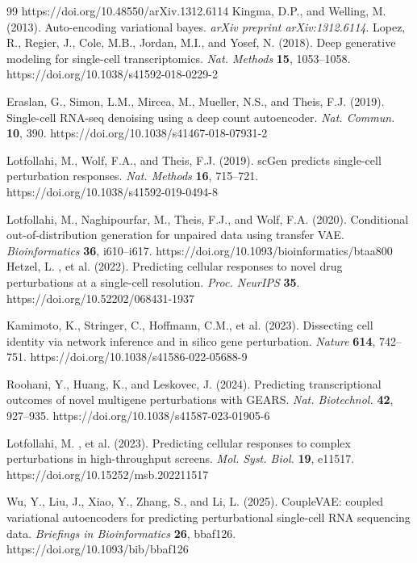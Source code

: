 \documentclass[11pt,a4paper]{article}
\begin{document}
\begin{thebibliography}{99}
 https://doi.org/10.48550/arXiv.1312.6114 Kingma, D.P., and Welling, M. (2013). Auto-encoding variational bayes. \textit{arXiv preprint arXiv:1312.6114}.
 Lopez, R., Regier, J., Cole, M.B., Jordan, M.I., and Yosef, N. (2018). Deep generative modeling for single-cell transcriptomics. \textit{Nat. Methods} \textbf{15}, 1053--1058. https://doi.org/10.1038/s41592-018-0229-2

 Eraslan, G., Simon, L.M., Mircea, M., Mueller, N.S., and Theis, F.J. (2019). Single-cell RNA-seq denoising using a deep count autoencoder. \textit{Nat. Commun.} \textbf{10}, 390. https://doi.org/10.1038/s41467-018-07931-2

 Lotfollahi, M., Wolf, F.A., and Theis, F.J. (2019). scGen predicts single-cell perturbation responses. \textit{Nat. Methods} \textbf{16}, 715--721. https://doi.org/10.1038/s41592-019-0494-8

 Lotfollahi, M., Naghipourfar, M., Theis, F.J., and Wolf, F.A. (2020). Conditional out-of-distribution generation for unpaired data using transfer VAE. \textit{Bioinformatics} \textbf{36}, i610--i617. https://doi.org/10.1093/bioinformatics/btaa800
 Hetzel, L. , et al. (2022). Predicting cellular responses to novel drug perturbations at a single-cell resolution. \textit{Proc. NeurIPS} \textbf{35}. https://doi.org/10.52202/068431-1937

 Kamimoto, K., Stringer, C., Hoffmann, C.M., et al. (2023). Dissecting cell identity via network inference and in silico gene perturbation. \textit{Nature} \textbf{614}, 742--751. https://doi.org/10.1038/s41586-022-05688-9

 Roohani, Y., Huang, K., and Leskovec, J. (2024). Predicting transcriptional outcomes of novel multigene perturbations with GEARS. \textit{Nat. Biotechnol.} \textbf{42}, 927--935. https://doi.org/10.1038/s41587-023-01905-6

 Lotfollahi, M. , et al. (2023). Predicting cellular responses to complex perturbations in high-throughput screens. \textit{Mol. Syst. Biol.} \textbf{19}, e11517. https://doi.org/10.15252/msb.202211517

 Wu, Y., Liu, J., Xiao, Y., Zhang, S., and Li, L. (2025). CoupleVAE: coupled variational autoencoders for predicting perturbational single-cell RNA sequencing data. \textit{Briefings in Bioinformatics} \textbf{26}, bbaf126. https://doi.org/10.1093/bib/bbaf126


\end{thebibliography}
\end{document}
